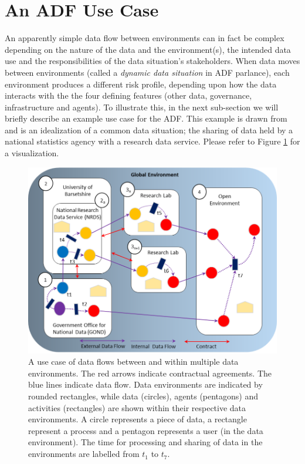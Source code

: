 \section{An ADF Use Case }\label{sec:usecase}
An apparently simple data flow between environments can in fact be complex depending on the nature of the data and the environment(s), the intended data use and the responsibilities of the data situation's stakeholders. When data moves between environments (called a \textit{dynamic data situation} in ADF parlance), each environment produces a different risk profile, depending upon how the data interacts with the the four defining features (other data, governance, infrastructure and agents). To illustrate this, in the next sub-section we will briefly describe an example use case for the ADF. This example is drawn from \cite{elliot2020anonymisation} and is an idealization of a common data situation; the sharing of data held by a national statistics agency with a research data service. Please refer to Figure \ref{fig1} for a visualization. 
\begin{figure}
\includegraphics[width=\linewidth]{Picture1a.png}
\caption{A use case of data flows between and within multiple data environments. The red arrows indicate contractual agreements. The blue lines indicate data flow. Data environments are indicated by rounded rectangles, while data (circles), agents (pentagons) and activities (rectangles) are shown within their respective data environments. A circle represents a piece of data, a rectangle represent a process and a pentagon represents a user (in the data environment). The time for processing and sharing of data in the environments are labelled from \begin {math}t_1 \end{math} to \begin {math}t_7\end{math}.} \label{fig1}
\end{figure}
